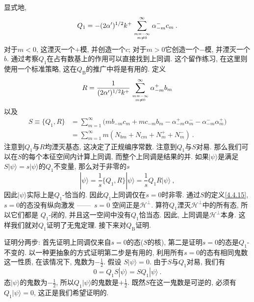 显式地, 
\begin{equation}
Q_{1}=-(2 \alpha^{\prime})^{1 / 2} k^{+} \sum_{m=-\infty \atop m \neq 0}^{\infty} \alpha_{-m}^{-} c_{m} \:. \label{4.4.13}
\end{equation}
对于$m<0$, 这湮灭一个$+$模, 并创造一个$c$; 对于$m>0$它创造一个$-$模, 并湮灭一个$b$. 通过考察$Q_{1}$在占有数基上的作用可以直接找到上同调. 这个留作练习, 在这里则使用一个标准策略, 这在$Q_{\mathrm{B}}$的推广中将是有用的. 定义
\begin{equation}
R=\frac{1}{(2 \alpha^{\prime})^{1 / 2} k^{+}} \sum_{m=-\infty \atop m \neq 0}^{\infty} \alpha_{-m}^{+} b_{m} \label{4.4.14}
\end{equation}
以及
\begin{align}
S \equiv \{Q_{1}, R \} &=\sum_{m=1}^{\infty}\bigl(m b_{-m} c_{m}+m c_{-m} b_{m}-\alpha_{-m}^{+} \alpha_{m}^{-}-\alpha_{-m}^{-} \alpha_{m}^{+}\bigr)  \nonumber \\
&=\sum_{m=1}^{\infty} m(N_{b m}+N_{c m}+N_{m}^{+}+N_{m}^{-}) \:. \label{4.4.15}
\end{align}
注意到$Q_{1}$与$R$均湮灭基态, 这决定了正规编序常数. 注意到$Q_{1}$与$S$对易. 那么我们可以在$S$的每个本征空间内计算上同调, 而整个上同调是结果的并. 
如果$|\psi\rangle$是满足$S|\psi\rangle=s|\psi\rangle$的$Q_{1}$不变量, 那么对于非零的$s$
\begin{equation}
|\psi\rangle=\frac{1}{s}\{Q_{1}, R\}|\psi\rangle=\frac{1}{s} Q_{1} R|\psi\rangle \:, \label{4.4.16}
\end{equation}
因此$|\psi\rangle$实际上是$Q_{1}$-恰当的. 因此$Q_{1}$上同调仅在$s=0$时非零. 通过$S$的定义\eqref{4.4.15},  $s=0$的态没有纵向激发 ——\, $s=0$ 空间正是$\mathscr{H}^{\perp}$. 算符$Q_{1}$湮灭$\mathscr{H}^{\perp}$中的所有态, 所以它们都是 $Q_{1}$-闭的, 并且这一空间中没有$Q_{1}$恰当态. 因此, 上同调是$\mathscr{H}^{\perp}$本身. 
这样我们就对$Q_{1}$证明了无鬼定理. 接下来对$Q_{\mathrm{B}}$证明.

证明分两步: 首先证明上同调仅来自$s=0$的态($S$的核), 第二是证明$s=0$的态是$Q_{1}$-不变的. 以一种更抽象的方式证明第二步是有用的, 利用所有$s=0$的态有相同鬼数这一性质, 
在该情况下, 鬼数为$-\frac{1}{2}$. 假设 $S|\psi\rangle=0$. 由于$S$与$Q_{1}$对易, 我们有
\begin{equation}
0=Q_{1} S|\psi\rangle=S Q_{1}|\psi\rangle \:. \label{4.4.17}
\end{equation}
态$|\psi\rangle$的鬼数为$-\frac{1}{2}$, 所以$Q_{1}|\psi\rangle$的鬼数是$+\frac{1}{2}$. 既然$S$在这一鬼数是可逆的, 必须有$Q_{1}|\psi\rangle=0$, 这正是我们希望证明的.

